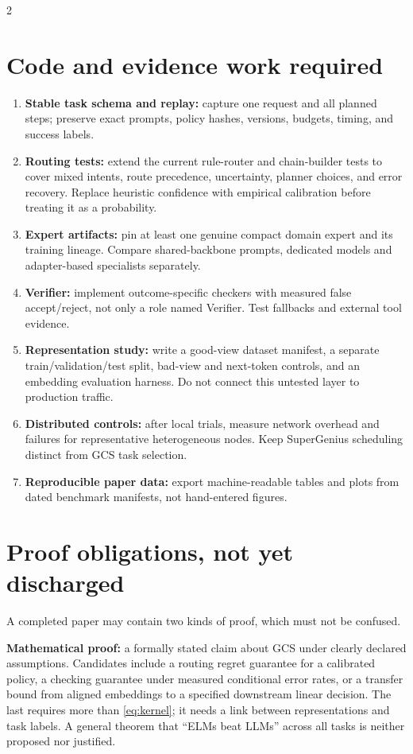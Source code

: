 \documentclass[10pt,letterpaper]{article}
\begin{document}
\begin{multicols}{2}
\section{Code and evidence work required}
\begin{enumerate}
\item \textbf{Stable task schema and replay:} capture one request and all planned steps; preserve exact prompts, policy hashes, versions, budgets, timing, and success labels.
\item \textbf{Routing tests:} extend the current rule-router and chain-builder tests to cover mixed intents, route precedence, uncertainty, planner choices, and error recovery. Replace heuristic confidence with empirical calibration before treating it as a probability.
\item \textbf{Expert artifacts:} pin at least one genuine compact domain expert and its training lineage. Compare shared-backbone prompts, dedicated models and adapter-based specialists separately.
\item \textbf{Verifier:} implement outcome-specific checkers with measured false accept/reject, not only a role named Verifier. Test fallbacks and external tool evidence.
\item \textbf{Representation study:} write a good-view dataset manifest, a separate train/validation/test split, bad-view and next-token controls, and an embedding evaluation harness. Do not connect this untested layer to production traffic.
\item \textbf{Distributed controls:} after local trials, measure network overhead and failures for representative heterogeneous nodes. Keep SuperGenius scheduling distinct from GCS task selection.
\item \textbf{Reproducible paper data:} export machine-readable tables and plots from dated benchmark manifests, not hand-entered figures.
\end{enumerate}

\section{Proof obligations, not yet discharged}
A completed paper may contain two kinds of proof, which must not be confused.

\textbf{Mathematical proof:} a formally stated claim about GCS under clearly declared assumptions. Candidates include a routing regret guarantee for a calibrated policy, a checking guarantee under measured conditional error rates, or a transfer bound from aligned embeddings to a specified downstream linear decision. The last requires more than \eqref{eq:kernel}; it needs a link between representations and task labels. A general theorem that ``ELMs beat LLMs'' across all tasks is neither proposed nor justified.


\end{multicols}
\end{document}

